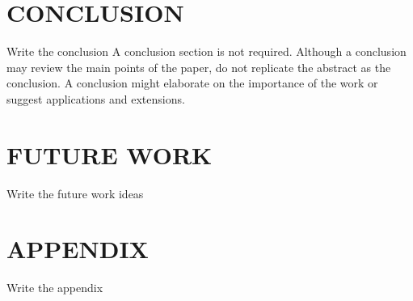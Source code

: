 \documentclass[letterpaper, 10 pt, conference]{IEEEconf}
\newcommand{\todo}[1]{{\color{red}#1}}
\begin{document}
\section{CONCLUSION}

\todo{Write the conclusion}
A conclusion section is not required. Although a conclusion may review the main points of the paper, do not replicate the abstract as the conclusion. A conclusion might elaborate on the importance of the work or suggest applications and extensions.

\section{FUTURE WORK}

\todo{Write the future work ideas}

\addtolength{\textheight}{-12cm}


\section*{APPENDIX}

\todo{Write the appendix}

\begin{center}
\end{center}



\nocite{*}
\printbibliography
\end{document}
